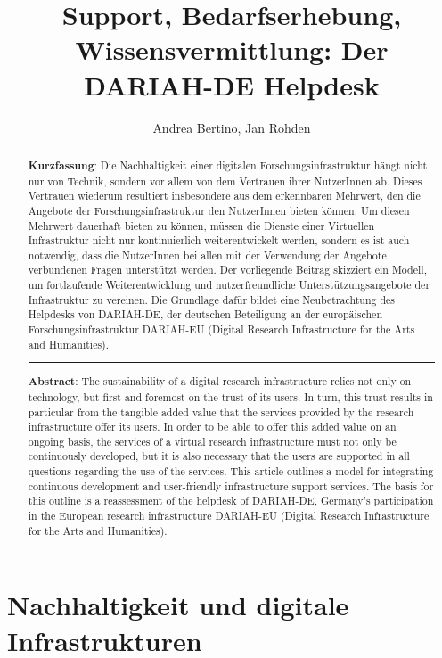 \documentclass[a4paper,
fontsize=11pt,
oneside,
numbers=noperiodatend,
parskip=half-,
bibliography=totoc,
final
]{scrartcl}
\title{\LARGE{Support, Bedarfserhebung, Wissensvermittlung: Der DARIAH-DE Helpdesk}} %
\author{Andrea Bertino, Jan Rohden} %
\date{}
\begin{document}
\maketitle
\thispagestyle{fancyplain} 

\begin{abstract}
\noindent
\textbf{Kurzfassung}: Die Nachhaltigkeit einer digitalen
Forschungsinfrastruktur hängt nicht nur von Technik, sondern vor allem
von dem Vertrauen ihrer NutzerInnen ab. Dieses Vertrauen wiederum
resultiert insbesondere aus dem erkennbaren Mehrwert, den die Angebote
der Forschungsinfrastruktur den NutzerInnen bieten können. Um diesen
Mehrwert dauerhaft bieten zu können, müssen die Dienste einer Virtuellen
Infrastruktur nicht nur kontinuierlich weiterentwickelt werden, sondern
es ist auch notwendig, dass die NutzerInnen bei allen mit der Verwendung
der Angebote verbundenen Fragen unterstützt werden. Der vorliegende
Beitrag skizziert ein Modell, um fortlaufende Weiterentwicklung und
nutzerfreundliche Unterstützungsangebote der Infrastruktur zu vereinen.
Die Grundlage dafür bildet eine Neubetrachtung des Helpdesks von
DARIAH-DE, der deutschen Beteiligung an der europäischen
Forschungsinfrastruktur DARIAH-EU (Digital Research Infrastructure for
the Arts and Humanities).

\begin{center}\rule{0.5\linewidth}{\linethickness}\end{center}
\noindent
\textbf{Abstract}: The sustainability of a digital research
infrastructure relies not only on technology, but first and foremost on
the trust of its users. In turn, this trust results in particular from
the tangible added value that the services provided by the research
infrastructure offer its users. In order to be able to offer this added
value on an ongoing basis, the services of a virtual research
infrastructure must not only be continuously developed, but it is also
necessary that the users are supported in all questions regarding the
use of the services. This article outlines a model for integrating
continuous development and user-friendly infrastructure support
services. The basis for this outline is a reassessment of the helpdesk
of DARIAH-DE, Germany's participation in the European research
infrastructure DARIAH-EU (Digital Research Infrastructure for the Arts
and Humanities).
\end{abstract}

\hypertarget{nachhaltigkeit-und-digitale-infrastrukturen}{%
\section{Nachhaltigkeit und digitale
Infrastrukturen}\label{nachhaltigkeit-und-digitale-infrastrukturen}}
\end{document}
